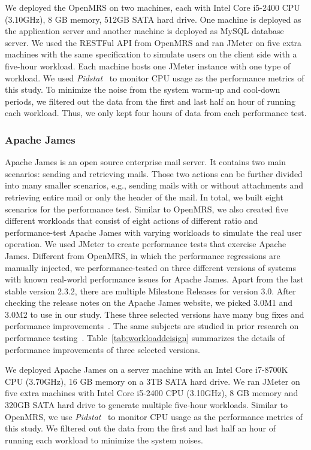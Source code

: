 We deployed the OpenMRS on two machines, each with Intel Core i5-2400 CPU (3.10GHz), 8 GB memory, 512GB SATA hard drive. One machine is deployed as the application server and another machine is deployed as MySQL database server. We used the RESTFul API from OpenMRS and ran JMeter on five extra machines with the same specification to simulate users on the client side with a five-hour workload. Each machine hosts one JMeter instance with one type of workload. We used \emph{Pidstat}~\citep{pidstat} to monitor CPU usage as the performance metrics of this study.
To minimize the noise from the system warm-up and cool-down periods, we filtered out the data from the first and last half an hour of running each workload. Thus, we only kept four hours of data from each performance test.

\subsubsection{Apache James}
Apache James is an open source enterprise mail server. It contains two main scenarios: sending and retrieving mails. Those two actions can be further divided into many smaller scenarios, e.g., sending mails with or without attachments and retrieving entire mail or only the header of the mail. In total, we built eight scenarios for the performance test. Similar to OpenMRS, we also created five different workloads that consist of eight actions of different ratio and performance-test Apache James with varying workloads to simulate the real user operation. We used JMeter to create performance tests that exercise Apache James. Different from OpenMRS, in which the performance regressions are manually injected, we performance-tested on three different versions of systems with known real-world performance issues for Apache James. Apart from the last stable version 2.3.2, there are multiple Milestone Releases for version 3.0. After checking the release notes on the Apache James website, we picked 3.0M1 and 3.0M2 to use in our study. These three selected versions have many bug fixes and performance improvements~\citep{Apache-James}. The same subjects are studied in prior research on performance testing~\citep{DBLP:conf/icst/GaoJBL16}. Table~\ref{tab:workloaddeisign} summarizes the details of performance improvements of three selected versions. 

We deployed Apache James on a server machine with an Intel Core i7-8700K CPU (3.70GHz), 16 GB memory on a 3TB SATA hard drive. We ran JMeter on five extra machines with Intel Core i5-2400 CPU (3.10GHz), 8 GB memory and 320GB SATA hard drive to generate multiple five-hour workloads. Similar to OpenMRS, we use \emph{Pidstat}~\citep{pidstat} to monitor CPU usage as the performance metrics of this study. We filtered out the data from the first and last half an hour of running each workload to minimize the system noises. 

